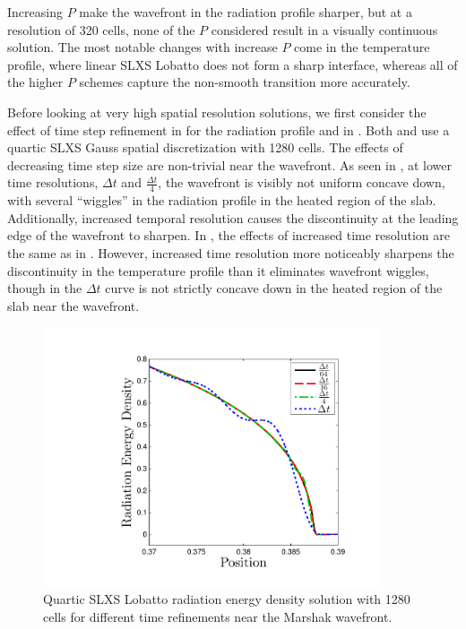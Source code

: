 Increasing $P$ make the wavefront in the radiation profile sharper, but at a resolution of 320 cells, none of the $P$ considered result in a visually continuous solution.
The most notable changes with increase $P$ come in the temperature profile, where linear SLXS Lobatto does not form a sharp interface, whereas all of the higher $P$ schemes capture the non-smooth transition more accurately.

Before looking at very high spatial resolution solutions, we first consider the effect of time step refinement in  for the radiation profile and in .
Both  and  use a quartic SLXS Gauss spatial discretization with 1280 cells.
The effects of decreasing time step size are non-trivial near the wavefront.
As seen in , at lower time resolutions, $\Delta t$ and $\frac{\Delta t}{4}$, the wavefront is visibly not uniform concave down, with several ``wiggles'' in the radiation profile in the heated region of the slab.
Additionally, increased temporal resolution causes the discontinuity at the leading edge of the wavefront to sharpen.
In , the effects of increased time resolution are the same as in .
However, increased time resolution more noticeably sharpens the discontinuity in the temperature profile than it eliminates wavefront wiggles, though in  the $\Delta t$ curve is not strictly concave down in the heated region of the slab near the wavefront.
%
%
\begin{figure}[!htp]
\centering
\includegraphics[width=10cm,trim=1.0in  0.2in 0.5in 0.5in,clip=true]{chapter6_grey_radtran/Dissertation_Data/Time_Refinement_Zoom_Radiation.pdf}
\caption{Quartic SLXS Lobatto radiation energy density solution with 1280 cells for different time refinements near the Marshak wavefront.}
\label{fig:time_refinement_rad}
\end{figure}
